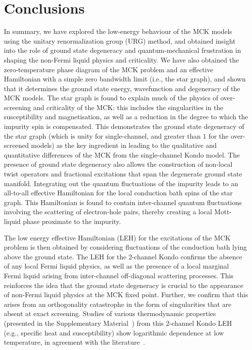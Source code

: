 \documentclass{iopart}
\begin{document}
\section{Conclusions}\label{conclusions}
\par\noindent
In summary, we have explored the low-energy behaviour of the MCK models using the unitary renormalization group (URG) method, and obtained insight into the role of ground state degeneracy and quantum-mechanical frustration in shaping the non-Fermi liquid physics and criticality. We have also obtained the zero-temperature phase diagram of the MCK problem and an effective Hamiltonian with a simple zero bandwidth limit (i.e., the star graph), and shown that it determines the ground state energy, wavefunction and degeneracy of the MCK models. The star graph is found to explain much of the physics of over-screening and criticality of the MCK: this includes the singularities in the susceptibility and magnetisation, as well as a reduction in the degree to which the impurity spin is compensated. This demonstrates the ground state degeneracy of the star graph (which is unity for single-channel, and greater than $1$ for the over-screened models) as the key ingredient in leading to the qualitative and quantitative differences of the MCK from the single-channel Kondo model. The presence of ground state degeneracy also allows the construction of non-local twist operators and fractional excitations that span the degenerate ground state manifold.
Integrating out the quantum fluctuations of the impurity leads to an all-to-all effective Hamiltonian for the local conduction bath spins of the star graph. This Hamiltonian is found to contain inter-channel quantum fluctuations involving the scattering of electron-hole pairs, thereby creating a local Mott-liquid phase proximate to the impurity.
\par 
The low energy effective Hamiltonian (LEH) for the excitations of the MCK problem is then obtained by considering fluctuations of the conduction bath lying above the ground state. The LEH for the 2-channel Kondo confirms the absence of any local Fermi liquid physics, as well as the presence of a local marginal Fermi liquid arising from inter-channel off-diagonal scattering processes. This reinforces the idea that the ground state degeneracy is crucial to the appearance of non-Fermi liquid physics at the MCK fixed point. Further, we confirm that this arises from an orthogonality catastrophe in the form of singularities that are absent at exact screening. Studies of various thermodynamic properties (presented in the Supplementary Material~\cite{SM}) from this 2-channel Kondo LEH (e.g., specific heat and susceptibility) show logarithmic dependence at low temperature, in agreement with the literature~\cite{affleck_1991_overscreen,affleck_ludwig_1991,affleck_pang_cox_1992,affleck1993exact,parcollet_olivier_large_N,affleck_2005,emery_kivelson,andrei_destri_1984,Tsvelick1984,Tsvelick_1985,andrei_jerez_1995,zarand_costi_2002}.
\end{document}
